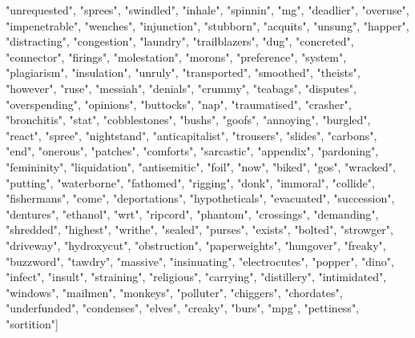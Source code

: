"unrequested", "sprees", "swindled", "inhale", "spinnin", "mg", "deadlier", "overuse", "impenetrable", "wenches", "injunction", "stubborn", "acquits", "unsung", "happer", "distracting", "congestion", "laundry", "trailblazers", "dug", "concreted", "connector", "firings", "molestation", "morons", "preference", "system", "plagiarism", "insulation", "unruly", "transported", "smoothed", "theists", "however", "ruse", "messiah", "denials", "crummy", "teabags", "disputes", "overspending", "opinions", "buttocks", "nap", "traumatised", "crasher", "bronchitis", "stat", "cobblestones", "bushs", "goofs", "annoying", "burgled", "react", "spree", "nightstand", "anticapitalist", "trousers", "slides", "carbons", "end", "onerous", "patches", "comforts", "sarcastic", "appendix", "pardoning", "femininity", "liquidation", "antisemitic", "foil", "now", "biked", "gos", "wracked", "putting", "waterborne", "fathomed", "rigging", "donk", "immoral", "collide", "fishermans", "come", "deportations", "hypotheticals", "evacuated", "succession", "dentures", "ethanol", "wrt", "ripcord", "phantom", "crossings", "demanding", "shredded", "highest", "writhe", "sealed", "purses", "exists", "bolted", "strowger", "driveway", "hydroxycut", "obstruction", "paperweights", "hungover", "freaky", "buzzword", "tawdry", "massive", "insinuating", "electrocutes", "popper", "dino", "infect", "insult", "straining", "religious", "carrying", "distillery", "intimidated", "windows", "mailmen", "monkeys", "polluter", "chiggers", "chordates", "underfunded", "condenses", "elves", "creaky", "burs", "mpg", "pettiness", "sortition"]